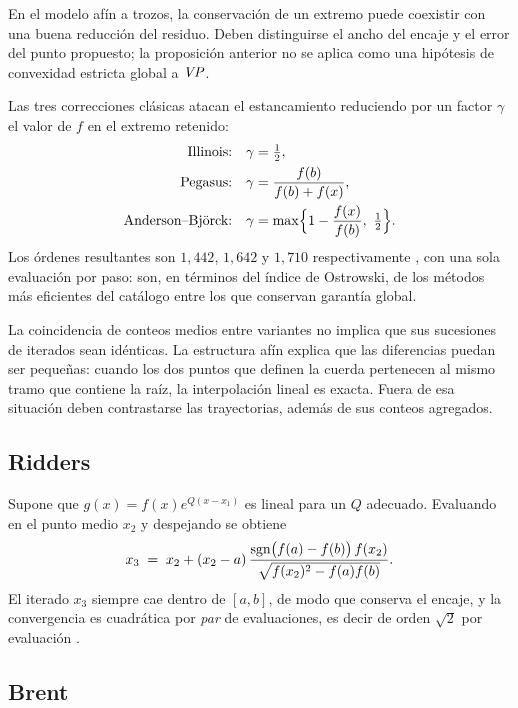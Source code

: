 En el modelo afín a trozos, la conservación de un extremo puede coexistir
con una buena reducción del residuo. Deben distinguirse el ancho del
encaje y el error del punto propuesto; la proposición anterior no se aplica
como una hipótesis de convexidad estricta global a $\mathit{VP}$.

Las tres correcciones clásicas atacan el estancamiento reduciendo por un factor
$\gamma$ el valor de $f$ en el extremo retenido:
\begin{align*}
  \text{Illinois:}&\quad \gamma=\tfrac12,\\
  \text{Pegasus:}&\quad \gamma=\frac{f(b)}{f(b)+f(x)},\\
  \text{Anderson--Björck:}&\quad \gamma=\max\Bigl\{1-\frac{f(x)}{f(b)},\ \tfrac12\Bigr\}.
\end{align*}
Los órdenes resultantes son $1{,}442$, $1{,}642$ y $1{,}710$ respectivamente
\citep{dowell1972,anderson1973}, con una sola evaluación por paso: son, en
términos del índice de Ostrowski, de los métodos más eficientes del catálogo entre
los que conservan garantía global.

\begin{remark}
La coincidencia de conteos medios entre variantes no implica que sus
sucesiones de iterados sean idénticas. La estructura afín explica que las
diferencias puedan ser pequeñas: cuando los dos puntos que definen la
cuerda pertenecen al mismo tramo que contiene la raíz, la interpolación
lineal es exacta. Fuera de esa situación deben contrastarse las
trayectorias, además de sus conteos agregados.
\end{remark}

\subsection{Ridders}

Supone que $g(x)=f(x)e^{Q(x-x_1)}$ es lineal para un $Q$ adecuado. Evaluando en el
punto medio $x_2$ y despejando se obtiene
\begin{equation}
\label{eq:ridders}
  x_3 \;=\; x_2 + (x_2-a)\,\frac{\operatorname{sgn}\bigl(f(a)-f(b)\bigr)\,f(x_2)}
                                {\sqrt{f(x_2)^2-f(a)f(b)}} .
\end{equation}
El iterado $x_3$ siempre cae dentro de $[a,b]$, de modo que conserva el encaje, y
la convergencia es cuadrática por \emph{par} de evaluaciones, es decir de orden
$\sqrt2$ por evaluación \citep{ridders1979}.

\subsection{Brent}

